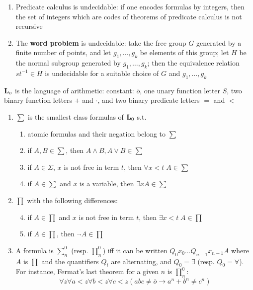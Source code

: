 \documentclass[11pt]{article}
\begin{document}
\begin{examplle}[]
\begin{enumerate}
\item Predicate calculus is undecidable: if one encodes formulas by integers, then
the set of integers which are codes of theorems of predicate calculus is not
recursive
\item The \textbf{word problem} is undecidable: take the free group \(G\) generated by a
finite number of points, and let \(g_1,\dots,g_k\) be elements of this group;
let \(H\) be the normal subgroup generated by \(g_1,\dots,g_k\); then the
equivalence relation \(st^{-1}\in H\) is undecidable for a suitable choice of
\(G\) and \(g_1,\dots,g_k\)
\end{enumerate}
\end{examplle}

\begin{definition}[]
\(\operatorname{\textbf{L}}_o\) is the language of arithmetic: constant: \(\overline{o}\), one unary
function letter \(S\), two binary function letters \(+\) and \(\cdot\), and two binary
predicate letters \(=\) and \(<\)
\begin{enumerate}
\item \(\sum\) is the smallest class formulas of \(\operatorname{\textbf{L}}_0\) s.t.
\begin{enumerate}
\item atomic formulas and their negation belong to \(\sum\)
\item if \(A,B\in\sum\), then \(A\wedge B,A\vee B\in\sum\)
\item if \(A\in\Sigma\), \(x\) is not free in term \(t\), then \(\forall x<t\; A\in\sum\)
\item if \(A\in\sum\) and \(x\) is a variable, then \(\exists xA\in\sum\)
\end{enumerate}
\item \(\prod\) with the following differences:
\begin{enumerate}
\setcounter{enumii}{3}
\item if \(A\in\prod\) and \(x\) is not free in term \(t\), then \(\exists
      x<t\; A\in\prod\)
\item if \(A\in\prod\), then \(\neg A\in\prod\)
\end{enumerate}
\item A formula is \(\sum^0_n\) (resp. \(\prod_n^0\)) iff it can be written 
\(Q_0x_0\dots Q_{n-1}x_{n-1}A\) where \(A\) is \(\prod\) and the quantifiers \(Q_i\)
are alternating, and \(Q_0=\exists\) (resp. \(Q_0=\forall\)). For instance,
Fermat's last theorem for a given \(n\) is \(\prod_n^0\):
\begin{equation*}
\forall z\forall a<z\forall b<z\forall c<z(abc\neq\overline{o}\to
a^n+b^n\neq c^n)
\end{equation*}
\end{enumerate}
\end{definition}
\end{document}
